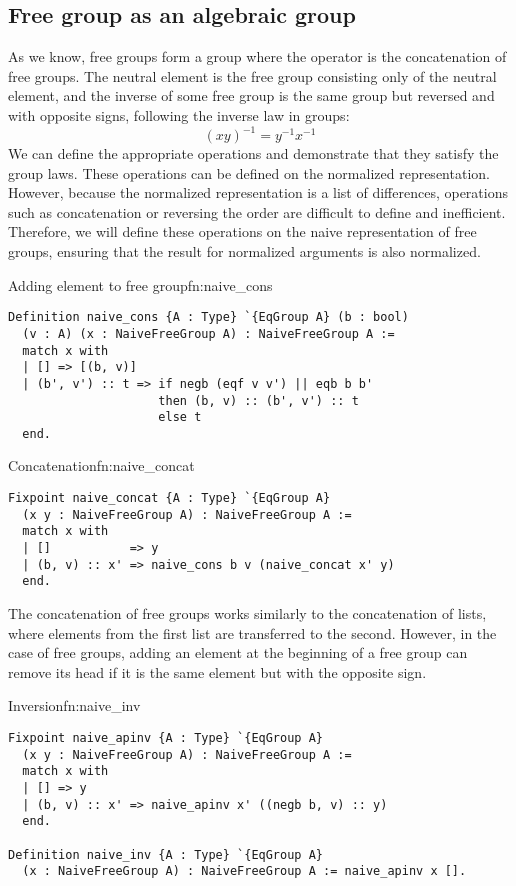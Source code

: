 \subsection{Free group as an algebraic group}
As we know, free groups form a group where the operator is the concatenation of free groups. The neutral element is the free group consisting only of the neutral element, and the inverse of some free group is the same group but reversed and with opposite signs, following the inverse law in groups:
$$
(xy)^{-1} = y^{-1}x^{-1}
$$
We can define the appropriate operations and demonstrate that they satisfy the group laws. These operations can be defined on the normalized representation. However, because the normalized representation is a list of differences, operations such as concatenation or reversing the order are difficult to define and inefficient. Therefore, we will define these operations on the naive representation of free groups, ensuring that the result for normalized arguments is also normalized.
\begin{func}{Adding element to free group}{fn:naive_cons}
\begin{verbatim}
Definition naive_cons {A : Type} `{EqGroup A} (b : bool) 
  (v : A) (x : NaiveFreeGroup A) : NaiveFreeGroup A :=
  match x with
  | [] => [(b, v)]
  | (b', v') :: t => if negb (eqf v v') || eqb b b'
                     then (b, v) :: (b', v') :: t
                     else t
  end.
\end{verbatim}
\end{func}
\begin{func}{Concatenation}{fn:naive_concat}
\begin{verbatim}
Fixpoint naive_concat {A : Type} `{EqGroup A} 
  (x y : NaiveFreeGroup A) : NaiveFreeGroup A :=
  match x with
  | []           => y
  | (b, v) :: x' => naive_cons b v (naive_concat x' y)
  end.
\end{verbatim}
\end{func}
The concatenation of free groups  works similarly to the concatenation of lists, where elements from the first list are transferred to the second. However, in the case of free groups, adding an element at the beginning of a free group can remove its head if it is the same element but with the opposite sign.
\begin{func}{Inversion}{fn:naive_inv}
\begin{verbatim}
Fixpoint naive_apinv {A : Type} `{EqGroup A} 
  (x y : NaiveFreeGroup A) : NaiveFreeGroup A :=
  match x with
  | [] => y
  | (b, v) :: x' => naive_apinv x' ((negb b, v) :: y)
  end.

Definition naive_inv {A : Type} `{EqGroup A} 
  (x : NaiveFreeGroup A) : NaiveFreeGroup A := naive_apinv x [].
\end{verbatim}
\end{func}
